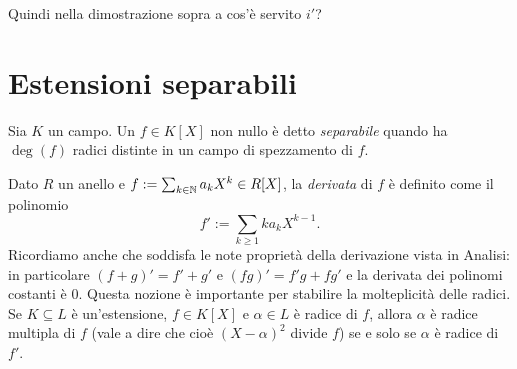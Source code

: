\begin{eser}
Quindi nella dimostrazione sopra a cos'è servito $i'$?
\end{eser}



\section{Estensioni separabili}

\begin{defi}
Sia $K$ un campo. Un $f \in K[X]$ non nullo è detto {\em separabile} quando ha $\deg(f)$ radici distinte in un campo di spezzamento di $f$.
\end{defi}

\begin{rich}
Dato $R$ un anello e $f := \sum_{k \in \mathbb{N}} a_kX^k \in R[X]$, la {\em derivata} di $f$ è definito come il polinomio
\[f' := \sum_{k \ge 1} ka_kX^{k-1} .\] 
Ricordiamo anche che soddisfa le note proprietà della derivazione vista in Analisi: in particolare $(f+g)' = f'+g'$ e $(fg)' = f'g + fg'$ e la derivata dei polinomi costanti è $0$.\newline
Questa nozione è importante per stabilire la molteplicità delle radici. Se $K \subseteq L$ è un'estensione, $f \in K[X]$ e $\alpha \in L$ è radice di $f$, allora $\alpha$ è radice multipla di $f$ (vale a dire che cioè $(X-\alpha)^2$ divide $f$) se e solo se $\alpha$ è radice di $f'$.
\end{rich}

